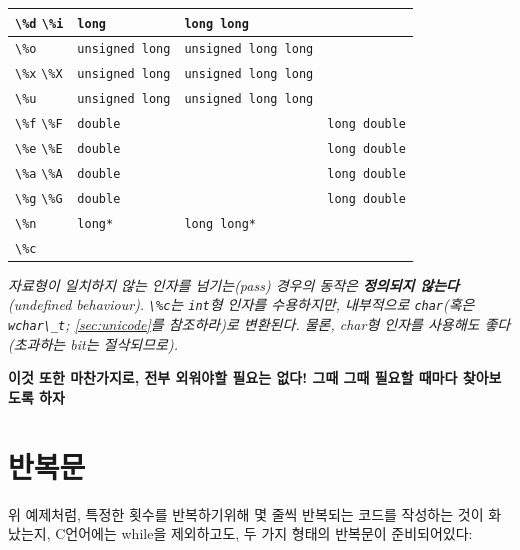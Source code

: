 \documentclass[a4paper,12pt]{book}
\newcommand{\V}[1]{\Verb|#1|}
\begin{document}
\begin{longtable}{ || m{5em} || m{7.5em} | m{10em} | m{7.5em} || }
        \hline \V{\%d} \V{\%i} & \V{long}          & \V{long long}          &                      \\
        \hline \V{\%o}         & \V{unsigned long} & \V{unsigned long long} &                      \\
        \hline \V{\%x} \V{\%X} & \V{unsigned long} & \V{unsigned long long} &                      \\
        \hline \V{\%u}         & \V{unsigned long} & \V{unsigned long long} &                      \\
        \hline \V{\%f} \V{\%F} & \V{double}        &                        & \V{long double}      \\
        \hline \V{\%e} \V{\%E} & \V{double}        &                        & \V{long double}      \\
        \hline \V{\%a} \V{\%A} & \V{double}        &                        & \V{long double}      \\
        \hline \V{\%g} \V{\%G} & \V{double}        &                        & \V{long double}      \\
        \hline \V{\%n}         & \V{long*}         & \V{long long*}         &                      \\
        \hline \V{\%c}         &                   &                        &                      \\ 
        \hline
    \end{longtable}
    \textit{\color{gray} \small * 자료형이 일치하지 않는 인자를 넘기는(pass) 경우의 동작은
    \textbf{정의되지 않는다}(undefined behaviour).}
    \newline
    \textit{\color{gray} \small * \V{\%c}는 \V{int}형 인자를 수용하지만,
    내부적으로 \V{char}(혹은 \V{wchar\_t}; \autoref{sec:unicode}를 참조하라)로 변환된다.
    물론, char형 인자를 사용해도 좋다(초과하는 bit는 절삭되므로).}
\endgroup

\textbf{
    이것 또한 마찬가지로, 전부 외워야할 필요는 없다!
    그때 그때 필요할 때마다 찾아보도록 하자
}


\section{반복문}

위 예제처럼, 특정한 횟수를 반복하기위해 몇 줄씩 반복되는 코드를 작성하는 것이 화났는지,
C언어에는 while을 제외하고도, 두 가지 형태의 반복문이 준비되어있다:
\end{document}
